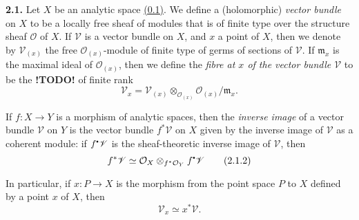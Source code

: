 \documentclass{report}
\newenvironment{rmenv}[1]
  {\phantomsection\par\medskip\noindent\textbf{#1.}\rmfamily}
  {\medskip}
\newcommand{\scr}[1]{{\mathscr{#1}}}
\renewcommand{\cal}[1]{{\mathcal{#1}}}
\newcommand{\sbullet}{{\mathbin{\vcenter{\hbox{\scalebox{.5}{$\bullet$}}}}}}
\newcommand{\todo}{\textbf{ !TODO! }}
\newcommand{\oldpage}[1]{\marginpar{\footnotesize$\Big\vert$ \textit{p.~#1}}}
\begin{document}
\oldpage{5}

\begin{rmenv}{2.1}
  Let $X$ be an analytic space \hyperref[0.1]{(0.1)}.
  We define a (holomorphic) \emph{vector bundle} on $X$ to be a locally free sheaf of modules that is of finite type over the structure sheaf $\cal{O}$ of $X$.
  If $\scr{V}$ is a vector bundle on $X$, and $x$ a point of $X$, then we denote by $\scr{V}_{(x)}$ the free $\cal{O}_{(x)}$-module of finite type of germs of sections of $\scr{V}$.
  If $\mathfrak{m}_x$ is the maximal ideal of $\cal{O}_{(x)}$, then we define the \emph{fibre at $x$ of the vector bundle $\scr{V}$} to be the \todo of finite rank
  \[
  \label{I.2.1.1}
    \scr{V}_x = \scr{V}_{(x)} \otimes_{\cal{O}_{(x)}} \cal{O}_{(x)}/\mathfrak{m}_x.
  \tag{2.1.1}
  \]

  If $f\colon X\to Y$ is a morphism of analytic spaces, then the \emph{inverse image} of a vector bundle $\scr{V}$ on $Y$ is the vector bundle $f^*\scr{V}$ on $X$ given by the inverse image of $\scr{V}$ as a coherent module:
  if $f^\sbullet\scr{V}$ is the sheaf-theoretic inverse image of $\scr{V}$, then
  \[
  \label{I.2.1.2}
    f^*\scr{V} \simeq \cal{O}_X \otimes_{f^*\cal{O}_Y} f^\sbullet\scr{V}
  \tag{2.1.2}
  \]

  In particular, if $x\colon P\to X$ is the morphism from the point space $P$ to $X$ defined by a point $x$ of $X$, then
  \[
    \label{I.2.1.3}
      \scr{V}_x \simeq x^*\scr{V}.
    \tag{2.1.3}
  \]
\end{rmenv}
\end{document}
